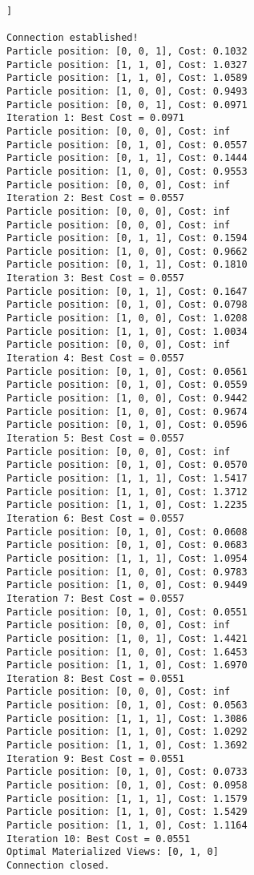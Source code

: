 

\begin{lstlisting}[style=pythonstyle, caption={Output from python code }, label={lst:pso_query_optimization}]]

Connection established!
Particle position: [0, 0, 1], Cost: 0.1032
Particle position: [1, 1, 0], Cost: 1.0327
Particle position: [1, 1, 0], Cost: 1.0589
Particle position: [1, 0, 0], Cost: 0.9493
Particle position: [0, 0, 1], Cost: 0.0971
Iteration 1: Best Cost = 0.0971
Particle position: [0, 0, 0], Cost: inf
Particle position: [0, 1, 0], Cost: 0.0557
Particle position: [0, 1, 1], Cost: 0.1444
Particle position: [1, 0, 0], Cost: 0.9553
Particle position: [0, 0, 0], Cost: inf
Iteration 2: Best Cost = 0.0557
Particle position: [0, 0, 0], Cost: inf
Particle position: [0, 0, 0], Cost: inf
Particle position: [0, 1, 1], Cost: 0.1594
Particle position: [1, 0, 0], Cost: 0.9662
Particle position: [0, 1, 1], Cost: 0.1810
Iteration 3: Best Cost = 0.0557
Particle position: [0, 1, 1], Cost: 0.1647
Particle position: [0, 1, 0], Cost: 0.0798
Particle position: [1, 0, 0], Cost: 1.0208
Particle position: [1, 1, 0], Cost: 1.0034
Particle position: [0, 0, 0], Cost: inf
Iteration 4: Best Cost = 0.0557
Particle position: [0, 1, 0], Cost: 0.0561
Particle position: [0, 1, 0], Cost: 0.0559
Particle position: [1, 0, 0], Cost: 0.9442
Particle position: [1, 0, 0], Cost: 0.9674
Particle position: [0, 1, 0], Cost: 0.0596
Iteration 5: Best Cost = 0.0557
Particle position: [0, 0, 0], Cost: inf
Particle position: [0, 1, 0], Cost: 0.0570
Particle position: [1, 1, 1], Cost: 1.5417
Particle position: [1, 1, 0], Cost: 1.3712
Particle position: [1, 1, 0], Cost: 1.2235
Iteration 6: Best Cost = 0.0557
Particle position: [0, 1, 0], Cost: 0.0608
Particle position: [0, 1, 0], Cost: 0.0683
Particle position: [1, 1, 1], Cost: 1.0954
Particle position: [1, 0, 0], Cost: 0.9783
Particle position: [1, 0, 0], Cost: 0.9449
Iteration 7: Best Cost = 0.0557
Particle position: [0, 1, 0], Cost: 0.0551
Particle position: [0, 0, 0], Cost: inf
Particle position: [1, 0, 1], Cost: 1.4421
Particle position: [1, 0, 0], Cost: 1.6453
Particle position: [1, 1, 0], Cost: 1.6970
Iteration 8: Best Cost = 0.0551
Particle position: [0, 0, 0], Cost: inf
Particle position: [0, 1, 0], Cost: 0.0563
Particle position: [1, 1, 1], Cost: 1.3086
Particle position: [1, 1, 0], Cost: 1.0292
Particle position: [1, 1, 0], Cost: 1.3692
Iteration 9: Best Cost = 0.0551
Particle position: [0, 1, 0], Cost: 0.0733
Particle position: [0, 1, 0], Cost: 0.0958
Particle position: [1, 1, 1], Cost: 1.1579
Particle position: [1, 1, 0], Cost: 1.5429
Particle position: [1, 1, 0], Cost: 1.1164
Iteration 10: Best Cost = 0.0551
Optimal Materialized Views: [0, 1, 0]
Connection closed.


\end{lstlisting}